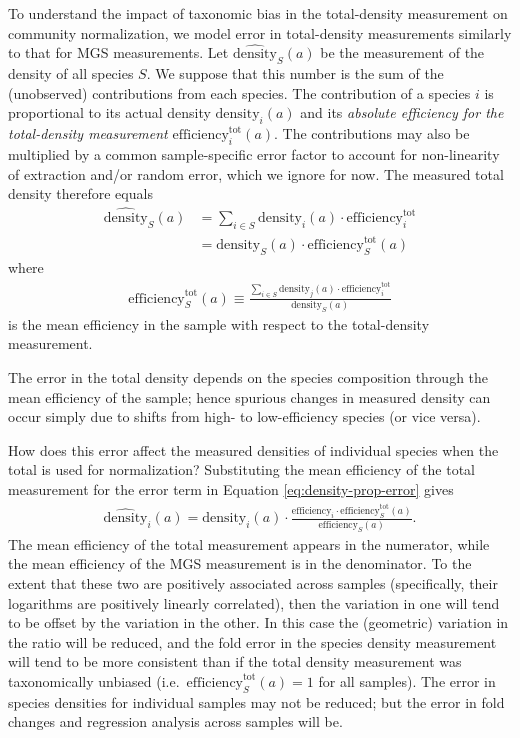 \documentclass[
]{article}
\begin{document}
To understand the impact of taxonomic bias in the total-density measurement on community normalization, we model error in total-density measurements similarly to that for MGS measurements.
Let \(\widehat{\text{density}}_{S}(a)\) be the measurement of the density of all species \(S\).
We suppose that this number is the sum of the (unobserved) contributions from each species.
The contribution of a species \(i\) is proportional to its actual density \(\text{density}_{i}(a)\) and its \emph{absolute efficiency for the total-density measurement} \(\text{efficiency}_{i}^{\text{tot}}(a)\).
The contributions may also be multiplied by a common sample-specific error factor to account for non-linearity of extraction and/or random error, which we ignore for now.
The measured total density therefore equals
\begin{align}
  \widehat{\text{density}}_S(a) 
  &= \sum_{i\in S} \text{density}_i(a) \cdot \text{efficiency}^{\text{tot}}_i
\\&= \text{density}_S(a) \cdot \text{efficiency}^{\text{tot}}_S(a)
\end{align}
where
\begin{align}
  \label{eq:app-total-mean-efficiency}
  \text{efficiency}^{\text{tot}}_S(a) 
  \equiv \frac{\sum_{i \in S}\text{density}_j(a)\cdot \text{efficiency}^{\text{tot}}_i}{\text{density}_S(a)}
\end{align}
is the mean efficiency in the sample with respect to the total-density measurement.

The error in the total density depends on the species composition through the mean efficiency of the sample; hence spurious changes in measured density can occur simply due to shifts from high- to low-efficiency species (or vice versa).

How does this error affect the measured densities of individual species when the total is used for normalization?
Substituting the mean efficiency of the total measurement for the error term in Equation \eqref{eq:density-prop-error} gives
\begin{align}
  \label{eq:density-prop-error-with-total-error}
  \widehat{\text{density}}_{i}(a) 
  = \text{density}_{i}(a) \cdot \frac{\text{efficiency}_{i} \cdot \text{efficiency}^{\text{tot}}_S(a)}{\text{efficiency}_S(a)}.
\end{align}
The mean efficiency of the total measurement appears in the numerator, while the mean efficiency of the MGS measurement is in the denominator.
To the extent that these two are positively associated across samples (specifically, their logarithms are positively linearly correlated), then the variation in one will tend to be offset by the variation in the other.
In this case the (geometric) variation in the ratio will be reduced, and the fold error in the species density measurement will tend to be more consistent than if the total density measurement was taxonomically unbiased (i.e.~\(\text{efficiency}^\text{tot}_S(a) = 1\) for all samples).
The error in species densities for individual samples may not be reduced; but the error in fold changes and regression analysis across samples will be.
\end{document}
